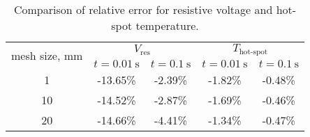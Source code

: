 \begin{table}[H]
    \caption{Comparison of relative error for resistive voltage and hot-spot temperature.} 
    \vspace{-1.em} 
    \fontsize{10}{10}
    \selectfont 
    \renewcommand{\arraystretch}{1.5}
    \begin{center}
        \begin{tabular}{ c | cc | cc }  
        \hline
        \multirow{2}{*}{mesh size, mm} & \multicolumn{2}{c|}{$V_\text{res}$} & \multicolumn{2}{c}{$T_\text{hot-spot}$} \\ 
           & $t=0.01~\text{s}$ & $t=0.1~\text{s}$ & $t=0.01~\text{s}$ & $t=0.1~\text{s}$ \\
        \hline
        1 & -13.65\% & -2.39\% & -1.82\% & -0.48\% \\
        10 & -14.52\% & -2.87\% & -1.69\% & -0.46\% \\
        20 & -14.66\% & -4.41\% & -1.34\% & -0.47\% \\
        \hline 
        \end{tabular}
    \end{center}  
     \label{table: 1d_qv_benchmarking_no_insulation_res_and_hot_spot_error_conclusion} 
 \end{table}